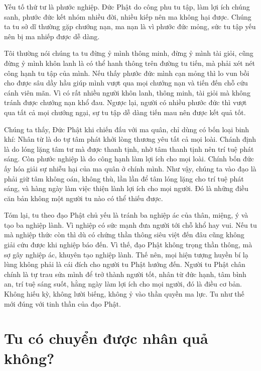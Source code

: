 \documentclass[
  12pt,
  oneside]{book}
\begin{document}
Yếu tố thứ tư là phước nghiệp. Đức Phật do công phu tu tập, làm lợi ích chúng sanh, phước đức kết nhóm nhiều đời, nhiều kiếp nên ma không hại được. Chúng ta tu sở dĩ thường gặp chướng nạn, ma nạn là vì phước đức mỏng, sức tu tập yếu nên bị ma nhiếp được dễ dàng.

Tôi thường nói chúng ta tu đừng ỷ mình thông minh, đừng ỷ mình tài giỏi, cũng đừng ỷ mình khôn lanh là có thể hanh thông trên đường tu tiến, mà phải xét nét công hạnh tu tập của mình. Nếu thấy phước đức mình cạn mỏng thì lo vun bồi cho được sâu dầy hầu giúp mình vượt qua mọi chướng nạn và tiến đến chỗ cứu cánh viên mãn. Vì có rất nhiều người khôn lanh, thông minh, tài giỏi mà không tránh được chướng nạn khổ đau. Ngược lại, người có nhiều phước đức thì vượt qua tất cả mọi chướng ngại, sự tu tập dễ dàng tiến mau nên được kết quả tốt.

Chúng ta thấy, Đức Phật khi chiến đấu với ma quân, chỉ dùng có bốn loại binh khí: Nhân từ là do tự tâm phát khởi lòng thương yêu tất cả mọi loài. Chánh định là do lóng lặng tâm tư mà được thanh tịnh, nhờ tâm thanh tịnh nên trí tuệ phát sáng. Còn phước nghiệp là do công hạnh làm lợi ích cho mọi loài. Chính bốn đức ấy hóa giải sự nhiễu hại của ma quân ở chính mình. Như vậy, chúng ta vào đạo là phải giữ tâm không oán, không thù, lần lần để tâm lóng lặng cho trí tuệ phát sáng, và hàng ngày làm việc thiện lành lợi ích cho mọi người. Đó là những điều căn bản không một người tu nào có thể thiếu được.

Tóm lại, tu theo đạo Phật chủ yếu là tránh ba nghiệp ác của thân, miệng, ý và tạo ba nghiệp lành. Vì nghiệp có sức mạnh đưa người tới chỗ khổ hay vui. Nếu tu mà nghiệp thức còn thì dù có chứng thần thông siêu việt đến đâu cũng không giải cứu được khi nghiệp báo đến. Vì thế, đạo Phật không trọng thần thông, mà sợ gây nghiệp ác, khuyên tạo nghiệp lành. Thế nên, mọi hiện tượng huyền bí lạ lùng không phải là cái đích cho người tu Phật hướng đến. Người tu Phật chân chính là tự trau sửa mình để trở thành người tốt, nhân từ đức hạnh, tâm bình an, trí tuệ sáng suốt, hằng ngày làm lợi ích cho mọi người, đó là điều cơ bản. Không hiếu kỳ, không lười biếng, không ỷ vào thần quyền ma lực. Tu như thế mới đúng với tinh thần của đạo Phật.

\hypertarget{tu-co-chuyen-duoc-nhan-qua-khong}{%
\chapter*{Tu có chuyển được nhân quả không?}\label{tu-co-chuyen-duoc-nhan-qua-khong}}
\end{document}
